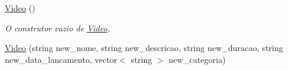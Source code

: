 \begin{DoxyCompactItemize}
\item 
\hyperlink{classVideo_ab67336c2c5b6227a9635bc7dcd6af543}{Video} ()\hypertarget{classVideo_ab67336c2c5b6227a9635bc7dcd6af543}{}\label{classVideo_ab67336c2c5b6227a9635bc7dcd6af543}

\begin{DoxyCompactList}\small\item\em O construtor vazio de \hyperlink{classVideo}{Video}. \end{DoxyCompactList}\item 
\hyperlink{classVideo_a103c29f246e60bc4bffa69540810833d}{Video} (string new\+\_\+nome, string new\+\_\+descricao, string new\+\_\+duracao, string new\+\_\+data\+\_\+lancamento, vector$<$ string $>$ new\+\_\+categoria)\hypertarget{classVideo_a103c29f246e60bc4bffa69540810833d}{}\label{classVideo_a103c29f246e60bc4bffa69540810833d}


\end{DoxyCompactItemize}
